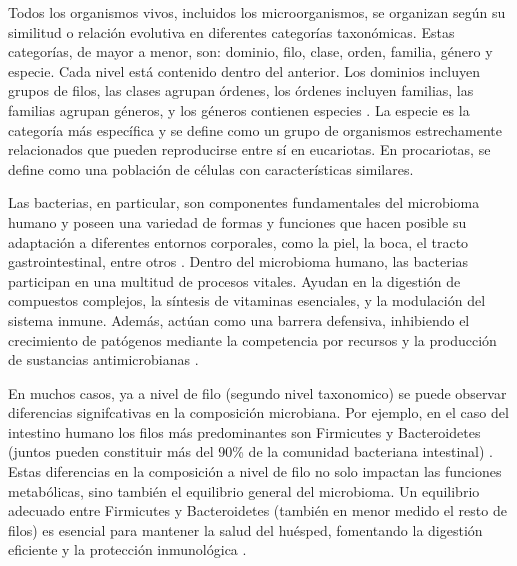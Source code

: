 
Todos los organismos vivos, incluidos los microorganismos, se organizan según su similitud o relación evolutiva en diferentes categorías taxonómicas. Estas categorías, de mayor a menor, son: dominio, filo, clase, orden, familia, género y especie. Cada nivel está contenido dentro del anterior. Los dominios incluyen grupos de filos, las clases agrupan órdenes, los órdenes incluyen familias, las familias agrupan géneros, y los géneros contienen especies \cite{pitt2012classification}. La especie es la categoría más específica y se define como un grupo de organismos estrechamente relacionados que pueden reproducirse entre sí en eucariotas. En procariotas, se define como una población de células con características similares.

Las bacterias, en particular, son componentes fundamentales del microbioma humano y poseen una variedad de formas y funciones que hacen posible su adaptación a diferentes entornos corporales, como la piel, la boca, el tracto gastrointestinal, entre otros \cite{cho2012human}. Dentro del microbioma humano, las bacterias participan en una multitud de procesos vitales. Ayudan en la digestión de compuestos complejos, la síntesis de vitaminas esenciales, y la modulación del sistema inmune. Además, actúan como una barrera defensiva, inhibiendo el crecimiento de patógenos mediante la competencia por recursos y la producción de sustancias antimicrobianas \cite{backhed2005host}.

En muchos casos, ya a nivel de filo (segundo nivel taxonomico) se puede observar diferencias signifcativas en la composición microbiana. Por ejemplo, en el caso del intestino humano los filos más predominantes son Firmicutes y Bacteroidetes (juntos pueden constituir más del 90\% de la comunidad bacteriana intestinal) \cite{ley2006human}. Estas diferencias en la composición a nivel de filo no solo impactan las funciones metabólicas, sino también el equilibrio general del microbioma. Un equilibrio adecuado entre Firmicutes y Bacteroidetes (también en menor medido el resto de filos) es esencial para mantener la salud del huésped, fomentando la digestión eficiente y la protección inmunológica \cite{turnbaugh2009core}.



